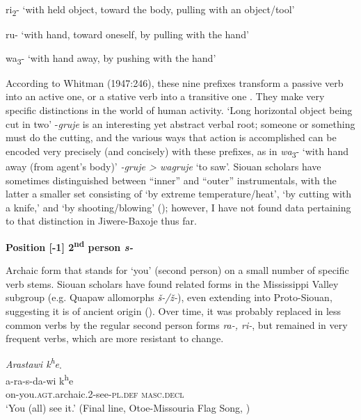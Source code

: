 \documentclass[output=paper]{LSP/langsci}
\begin{document}
\hspace{2em} ri\textsubscript{2}-  `with held object, toward the body, pulling with an object/tool'    		

\hspace{2em} ru- `with hand, toward oneself, by pulling with the hand' 			

\hspace{2em} wa\textsubscript{3}- `with hand away, by pushing with the hand'
\vspace{1em}

According to Whitman (1947:246), these nine prefixes transform a passive verb into an active one, or a stative verb into a transitive one \citep[483]{Rankin2005}. They make very specific distinctions in the world of human activity. `Long horizontal object being cut in two' -\textit{gruje} is an interesting yet abstract verbal root; someone or something must do the cutting, and the various ways that action is accomplished can be encoded very precisely (and concisely) with these prefixes, as in \textit{wa}\textsubscript{3}- `with hand away (from agent's body)' \textit{-gruje > wagruje} `to saw'.  Siouan scholars have sometimes distinguished between ``inner'' and ``outer'' instrumentals, with the latter a smaller set consisting of `by extreme temperature/heat', `by cutting with a knife,' and `by shooting/blowing' (\citealt[483-485]{Rankin2005}); however, I have not found data pertaining to that distinction in Jiwere-Baxoje thus far.   		
     
\vspace{1em}
\textbf{Position [-1]  2\textsuperscript{nd} person \textit{s-} }

Archaic form that stands for `you' (second person) on a small number of specific verb stems.  Siouan scholars have found related forms in the Mississippi Valley subgroup (e.g. Quapaw allomorphs \textit{\v{s}-/\v{z}-}), even extending into Proto-Siouan, suggesting it is of ancient origin (\citealt[479-480]{Rankin2005}).  Over time, it was probably replaced in less common verbs by the regular second person forms \textit{ra-, ri-}, but remained in very frequent verbs, which are more resistant to change.        

\begin{exe}
\ex 
\glll \textit{Arastawi k\textsuperscript{h}e}.\\
 a-ra-s-da-wi  k\textsuperscript{h}e  \\
on-you.\textsc{agt}.archaic.2-see-\textsc{pl.def} \textsc{masc.decl} \\
\trans `You (all) see it.'  (Final line, Otoe-Missouria Flag Song, \citealt{Greer2008})     
\end{exe}     
					 
\end{document}
